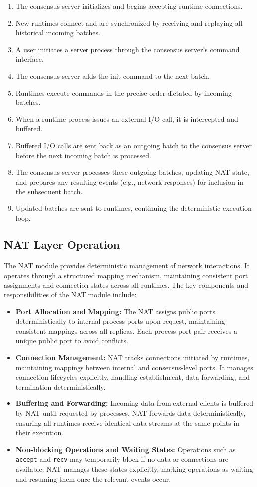 \documentclass[10pt, 
]{IEEEtran}
\begin{document}
\begin{enumerate}
\item The consensus server initializes and begins accepting runtime connections.
\item New runtimes connect and are synchronized by receiving and replaying all historical incoming batches.
\item A user initiates a server process through the consensus server's command interface.
\item The consensus server adds the init command to the next batch.
\item Runtimes execute commands in the precise order dictated by incoming batches.
\item When a runtime process issues an external I/O call, it is intercepted and buffered.
\item Buffered I/O calls are sent back as an outgoing batch to the consensus server before the next incoming batch is processed.
\item The consensus server processes these outgoing batches, updating NAT state, and prepares any resulting events (e.g., network responses) for inclusion in the subsequent batch.
\item Updated batches are sent to runtimes, continuing the deterministic execution loop.
\end{enumerate}


\subsection{NAT Layer Operation}

The NAT module provides deterministic management of network interactions. It operates through a structured mapping mechanism, maintaining consistent port assignments and connection states across all runtimes. The key components and responsibilities of the NAT module include:

\begin{itemize}
\item \textbf{Port Allocation and Mapping:} The NAT assigns public ports deterministically to internal process ports upon request, maintaining consistent mappings across all replicas. Each process-port pair receives a unique public port to avoid conflicts.
\item \textbf{Connection Management:} NAT tracks connections initiated by runtimes, maintaining mappings between internal and consensus-level ports. It manages connection lifecycles explicitly, handling establishment, data forwarding, and termination deterministically.
\item \textbf{Buffering and Forwarding:} Incoming data from external clients is buffered by NAT until requested by processes. NAT forwards data deterministically, ensuring all runtimes receive identical data streams at the same points in their execution.
\item \textbf{Non-blocking Operations and Waiting States:} Operations such as \texttt{accept} and \texttt{recv} may temporarily block if no data or connections are available. NAT manages these states explicitly, marking operations as waiting and resuming them once the relevant events occur.
\end{itemize}
\end{document}
